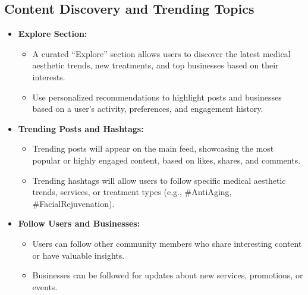 \subsection{Content Discovery and Trending Topics}
\begin{itemize}
    \item \textbf{Explore Section:}
    \begin{itemize}
        \item A curated “Explore” section allows users to discover the latest medical aesthetic trends, new treatments, and top businesses based on their interests.
        \item Use personalized recommendations to highlight posts and businesses based on a user's activity, preferences, and engagement history.
    \end{itemize}
    
    \item \textbf{Trending Posts and Hashtags:}
    \begin{itemize}
        \item Trending posts will appear on the main feed, showcasing the most popular or highly engaged content, based on likes, shares, and comments.
        \item Trending hashtags will allow users to follow specific medical aesthetic trends, services, or treatment types (e.g., \#AntiAging, \#FacialRejuvenation).
    \end{itemize}
    
    \item \textbf{Follow Users and Businesses:}
    \begin{itemize}
        \item Users can follow other community members who share interesting content or have valuable insights.
        \item Businesses can be followed for updates about new services, promotions, or events.
    \end{itemize}
\end{itemize}

